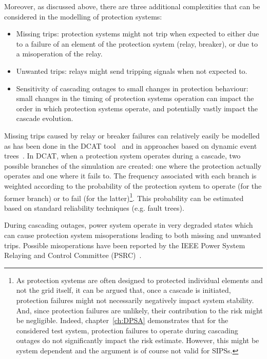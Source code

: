 Moreover, as discussed above, there are three additional complexities that can be considered in the modelling of protection systems:

\begin{itemize}
    \item Missing trips: protection systems might not trip when expected to either due to a failure of an element of the protection system (relay, breaker), or due to a misoperation of the relay.
    \item Unwanted trips: relays might send tripping signals when not expected to.
    \item Sensitivity of cascading outages to small changes in protection behaviour: small changes in the timing of protection systems operation can impact the order in which protection systems operate, and potentially vastly impact the cascade evolution.
\end{itemize}

Missing trips caused by relay or breaker failures can relatively easily be modelled as has been done in the DCAT tool~\cite{DCATphase1} and in approaches based on dynamic event trees~\cite{TwoLevelPSA}. In DCAT, when a protection system operates during a cascade, two possible branches of the simulation are created: one where the protection actually operates and one where it fails to. The frequency associated with each branch is weighted according to the probability of the protection system to operate (for the former branch) or to fail (for the latter)\footnote{As protection systems are often designed to protected individual elements and not the grid itself, it can be argued that, once a cascade is initiated, protection failures might not necessarily negatively impact system stability. And, since protection failures are unlikely, their contribution to the risk might be negligible. Indeed, chapter~\ref{ch:DPSA} demonstrates that for the considered test system, protection failures to operate during cascading outages do not significantly impact the risk estimate. However, this might be system dependent and the argument is of course not valid for SIPSs.}. This probability can be estimated based on standard reliability techniques (e.g. fault trees).

During cascading outages, power system operate in very degraded states which can cause protection system misoperations leading to both missing and unwanted trips. Possible misoperations have been reported by the IEEE Power System Relaying and Control Committee (PSRC)~\cite{ProtectionFailuresDemetrios, PSRCreportProtectionMisop, PSRCreportSummaryProtectionMisop}.

